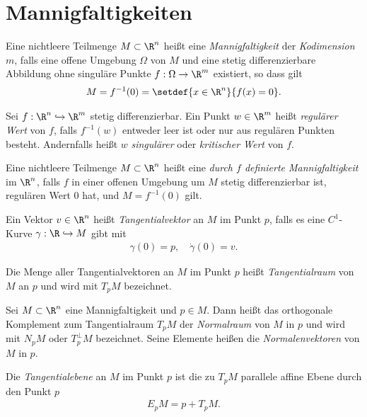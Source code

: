 \section{Mannigfaltigkeiten}

\begin{defn}
Eine nichtleere Teilmenge $M\subset \R^n$ heißt eine \emph{Mannigfaltigkeit} der
\emph{Kodimension $m$}, falls eine offene Umgebung $\Omega$ von $M$ und eine
stetig differenzierbare Abbildung ohne singuläre Punkte $f: \Omega\to\R^m$
existiert, so dass gilt
\begin{align*}
M = f^{-1}(0) = \setdef{x\in\R^n}{f(x) = 0}.
\end{align*}
\end{defn}
\begin{defn}
Sei $f: \R^n\hookrightarrow\R^m$ stetig differenzierbar. Ein Punkt $w\in
\R^m$ heißt \emph{regulärer Wert} von $f$, falls $f^{-1}(w)$ entweder leer ist
oder nur aus regulären Punkten besteht. Andernfalls heißt $w$ \emph{singulärer}
oder \emph{kritischer Wert} von $f$.
\end{defn}
\begin{defn}
Eine nichtleere Teilmenge $M\subset\R^n$ heißt eine \emph{durch $f$ definierte
Mannigfaltigkeit} im $\R^n$, falls $f$ in einer offenen Umgebung um $M$ stetig
differenzierbar ist, regulären Wert $0$ hat, und $M = f^{-1}(0)$ gilt.
\end{defn}
\begin{defn}
Ein Vektor $v\in\R^n$ heißt \emph{Tangentialvektor} an $M$ im Punkt $p$, falls
es eine $C^1$-Kurve $\gamma: \R\hookrightarrow M$ gibt mit
\begin{align*}
\gamma(0) = p,\quad \dot{\gamma}(0) = v.
\end{align*}
\end{defn}
\begin{defn}
Die Menge aller Tangentialvektoren an $M$ im Punkt $p$ heißt
\emph{Tangentialraum} von $M$ an $p$ und wird mit $T_pM$ bezeichnet.
\end{defn}
\begin{defn}
Sei $M\subset\R^n$ eine Mannigfaltigkeit und $p\in M$. Dann heißt das
orthogonale Komplement zum Tangentialraum $T_pM$ der \emph{Normalraum} von $M$
in $p$ und wird mit $N_pM$ oder $T_p^\bot M$ bezeichnet. Seine Elemente heißen
die \emph{Normalenvektoren} von $M$ in $p$.
\end{defn}
\begin{defn}
Die \emph{Tangentialebene} an $M$ im Punkt $p$ ist die zu $T_pM$ parallele
affine Ebene durch den Punkt $p$
\begin{align*}
E_p M = p + T_p M.
\end{align*}
\end{defn}

